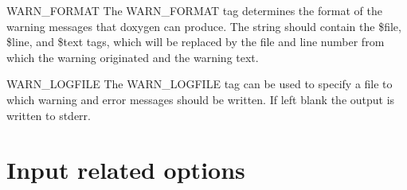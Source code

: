 \begin{DoxyDescription}
\label{config_cfg_warn_format}
\hypertarget{config_cfg_warn_format}{}
 
\item[{\ttfamily WARN\_\-FORMAT} ] The {\ttfamily WARN\_\-FORMAT} tag determines the format of the warning messages that doxygen can produce. The string should contain the {\ttfamily \$file}, {\ttfamily \$line}, and {\ttfamily \$text} tags, which will be replaced by the file and line number from which the warning originated and the warning text.

\label{config_cfg_warn_logfile}
\hypertarget{config_cfg_warn_logfile}{}
 
\item[{\ttfamily WARN\_\-LOGFILE} ] The {\ttfamily WARN\_\-LOGFILE} tag can be used to specify a file to which warning and error messages should be written. If left blank the output is written to stderr.


\end{DoxyDescription}\hypertarget{config_config_input}{}\section{Input related options}\label{config_config_input}
\label{config_cfg_input}
\hypertarget{config_cfg_input}{}
 
